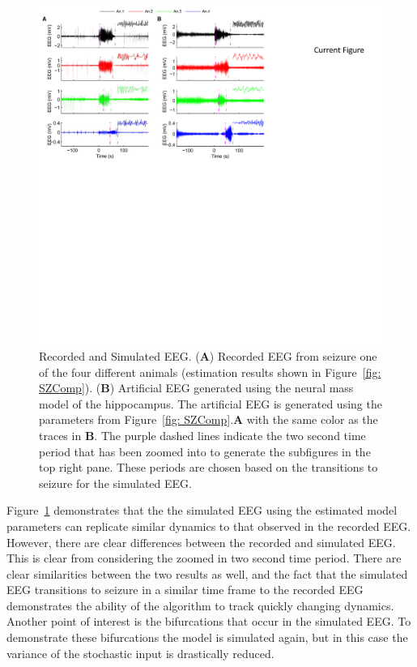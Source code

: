 \begin{figure}[ht]
 	\centering
 		\includegraphics{fig/EEGComparison.pdf}
 	\caption{Recorded and Simulated EEG. (\textbf{A}) Recorded EEG from seizure one of the four different animals (estimation results shown in Figure~\ref{fig: SZComp}). (\textbf{B}) Artificial EEG generated using the neural mass model of the hippocampus. The artificial EEG is generated using the parameters from Figure~\ref{fig: SZComp}.\textbf{A} with the same color as the traces in \textbf{B}. The purple dashed lines indicate the two second time period that has been zoomed into to generate the subfigures in the top right pane. These periods are chosen based on the transitions to seizure for the simulated EEG.}
 	\label{fig: EEGComp}
 \end{figure}

Figure~\ref{fig: EEGComp} demonstrates that the the simulated EEG using the estimated model parameters can replicate similar dynamics to that observed in the recorded EEG. However, there are clear differences between the recorded and simulated EEG. This is clear from considering the zoomed in two second time period. There are clear similarities between the two results as well, and the fact that the simulated EEG transitions to seizure in a similar time frame to the recorded EEG demonstrates the ability of the algorithm to track quickly changing dynamics. Another point of interest is the bifurcations that occur in the simulated EEG. To demonstrate these bifurcations the model is simulated again, but in this case the variance of the stochastic input is drastically reduced.

